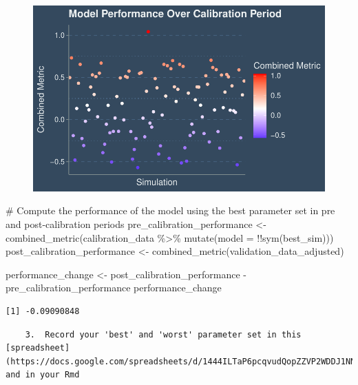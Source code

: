 \documentclass[
  letterpaper,
  DIV=11,
  numbers=noendperiod]{scrartcl}
\newenvironment{Shaded}{\begin{snugshade}}{\end{snugshade}}
\newcommand{\AttributeTok}[1]{\textcolor[rgb]{0.40,0.45,0.13}{#1}}
\newcommand{\CommentTok}[1]{\textcolor[rgb]{0.37,0.37,0.37}{#1}}
\newcommand{\FunctionTok}[1]{\textcolor[rgb]{0.28,0.35,0.67}{#1}}
\newcommand{\NormalTok}[1]{\textcolor[rgb]{0.00,0.23,0.31}{#1}}
\newcommand{\OtherTok}[1]{\textcolor[rgb]{0.00,0.23,0.31}{#1}}
\newcommand{\SpecialCharTok}[1]{\textcolor[rgb]{0.37,0.37,0.37}{#1}}
\begin{document}
\begin{figure}[H]

{\centering \includegraphics{calibration-assignment_files/figure-pdf/unnamed-chunk-11-1.pdf}

}

\end{figure}

\begin{Shaded}
\begin{Highlighting}[]
\CommentTok{\# Compute the performance of the model using the best parameter set in pre and post{-}calibration periods}
\NormalTok{pre\_calibration\_performance }\OtherTok{\textless{}{-}} \FunctionTok{combined\_metric}\NormalTok{(calibration\_data }\SpecialCharTok{\%\textgreater{}\%} \FunctionTok{mutate}\NormalTok{(}\AttributeTok{model =} \SpecialCharTok{!!}\FunctionTok{sym}\NormalTok{(best\_sim)))}
\NormalTok{post\_calibration\_performance }\OtherTok{\textless{}{-}} \FunctionTok{combined\_metric}\NormalTok{(validation\_data\_adjusted)}

\NormalTok{performance\_change }\OtherTok{\textless{}{-}}\NormalTok{ post\_calibration\_performance }\SpecialCharTok{{-}}\NormalTok{ pre\_calibration\_performance}
\NormalTok{performance\_change}
\end{Highlighting}
\end{Shaded}

\begin{verbatim}
[1] -0.09090848
\end{verbatim}

\begin{verbatim}
    3.  Record your 'best' and 'worst' parameter set in this [spreadsheet](https://docs.google.com/spreadsheets/d/1444ILTaP6pcqvudQopZZVP2WDDJ1NNgXX6sdPdwdbXE/edit#gid=0) and in your Rmd
\end{verbatim}
\end{document}
